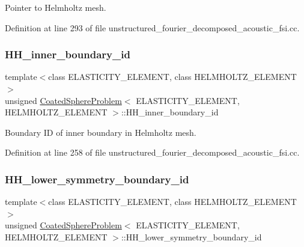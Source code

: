 Pointer to Helmholtz mesh. 



Definition at line 293 of file unstructured\+\_\+fourier\+\_\+decomposed\+\_\+acoustic\+\_\+fsi.\+cc.

\mbox{\label{classCoatedSphereProblem_a2d8f60f068d2e9442a9f096843ffb098}} 
\subsubsection{\texorpdfstring{H\+H\+\_\+inner\+\_\+boundary\+\_\+id}{HH\_inner\_boundary\_id}}
{\footnotesize\ttfamily template$<$class E\+L\+A\+S\+T\+I\+C\+I\+T\+Y\+\_\+\+E\+L\+E\+M\+E\+NT, class H\+E\+L\+M\+H\+O\+L\+T\+Z\+\_\+\+E\+L\+E\+M\+E\+NT$>$ \\
unsigned \hyperlink{classCoatedSphereProblem}{Coated\+Sphere\+Problem}$<$ E\+L\+A\+S\+T\+I\+C\+I\+T\+Y\+\_\+\+E\+L\+E\+M\+E\+NT, H\+E\+L\+M\+H\+O\+L\+T\+Z\+\_\+\+E\+L\+E\+M\+E\+NT $>$\+::H\+H\+\_\+inner\+\_\+boundary\+\_\+id\hspace{0.3cm}{\ttfamily [private]}}



Boundary ID of inner boundary in Helmholtz mesh. 



Definition at line 258 of file unstructured\+\_\+fourier\+\_\+decomposed\+\_\+acoustic\+\_\+fsi.\+cc.

\mbox{\label{classCoatedSphereProblem_a92c1c0e05c620f01d8b6851d952cfc19}} 
\subsubsection{\texorpdfstring{H\+H\+\_\+lower\+\_\+symmetry\+\_\+boundary\+\_\+id}{HH\_lower\_symmetry\_boundary\_id}}
{\footnotesize\ttfamily template$<$class E\+L\+A\+S\+T\+I\+C\+I\+T\+Y\+\_\+\+E\+L\+E\+M\+E\+NT, class H\+E\+L\+M\+H\+O\+L\+T\+Z\+\_\+\+E\+L\+E\+M\+E\+NT$>$ \\
unsigned \hyperlink{classCoatedSphereProblem}{Coated\+Sphere\+Problem}$<$ E\+L\+A\+S\+T\+I\+C\+I\+T\+Y\+\_\+\+E\+L\+E\+M\+E\+NT, H\+E\+L\+M\+H\+O\+L\+T\+Z\+\_\+\+E\+L\+E\+M\+E\+NT $>$\+::H\+H\+\_\+lower\+\_\+symmetry\+\_\+boundary\+\_\+id\hspace{0.3cm}{\ttfamily [private]}}



